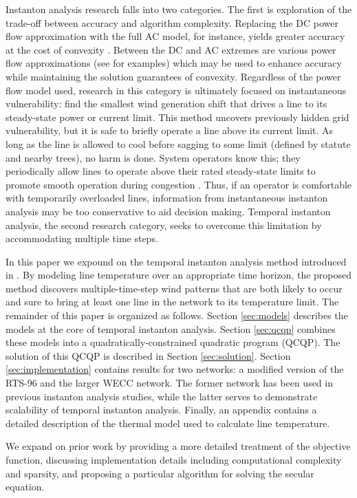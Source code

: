 \documentclass[journal,twoside]{IEEEtran}
\begin{document}
Instanton analysis research falls into two categories. The first is exploration of the trade-off between accuracy and algorithm complexity. Replacing the DC power flow approximation with the full AC model, for instance, yields greater accuracy at the cost of convexity \cite{baghsorkhi2012}. Between the DC and AC extremes are various power flow approximations (see \cite{coffrin2012,hijazi2013,coffrin2014} for examples) which may be used to enhance accuracy while maintaining the solution guarantees of convexity. Regardless of the power flow model used, research in this category is ultimately focused on instantaneous vulnerability: find the smallest wind generation shift that drives a line to its steady-state power or current limit. This method uncovers previously hidden grid vulnerability, but it is safe to briefly operate a line above its current limit. As long as the line is allowed to cool before sagging to some limit (defined by statute and nearby trees), no harm is done. System operators know this; they periodically allow lines to operate above their rated steady-state limits to promote smooth operation during congestion \cite{banakar2005}. Thus, if an operator is comfortable with temporarily overloaded lines, information from instantaneous instanton analysis may be too conservative to aid decision making. Temporal instanton analysis, the second research category, seeks to overcome this limitation by accommodating multiple time steps.


In this paper we expound on the temporal instanton analysis method introduced in \cite{kersulis2015}. By modeling line temperature over an appropriate time horizon, the proposed method discovers multiple-time-step wind patterns that are both likely to occur and sure to bring at least one line in the network to its temperature limit. The remainder of this paper is organized as follows. Section \ref{sec:models} describes the models at the core of temporal instanton analysis. Section \ref{sec:qcqp} combines these models into a quadratically-constrained quadratic program (QCQP). The solution of this QCQP is described in Section \ref{sec:solution}. Section \ref{sec:implementation}  contains results for two networks: a modified version of the RTS-96 and the larger WECC network. The former network has been used in previous instanton analysis studies, while the latter serves to demonstrate scalability of temporal instanton analysis. Finally, an appendix contains a detailed description of the thermal model used to calculate line temperature.

We expand on prior work by providing a more detailed treatment of the objective function, discussing implementation details including computational complexity and sparsity, and proposing a particular algorithm for solving the secular equation.
\end{document}
